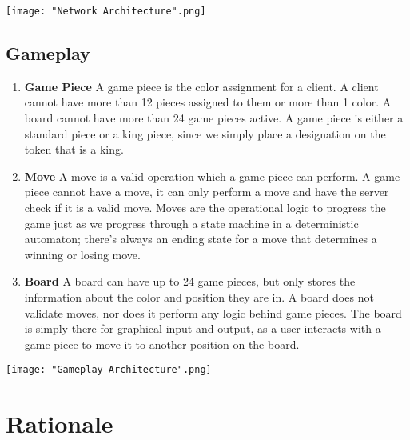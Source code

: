 \documentclass{scrreprt}
\begin{document}
			 \texttt{[image: "Network Architecture".png]}

		\subsection {Gameplay}
			\begin{enumerate} [label*=\arabic*.]
			\item \textbf{Game Piece}
				A game piece is the color assignment for a client. A client cannot have more than 12 pieces assigned to them or more than 1 color. A board cannot have more than 24 game pieces active. A game piece is either a standard piece or a king piece, since we simply place a designation on the token that is a king.
	
			\item \textbf{Move}
				A move is a valid operation which a game piece can perform. A game piece cannot have a move, it can only perform a move and have the server check if it is a valid move. Moves are the operational logic to progress the game just as we progress through a state machine in a deterministic automaton; there's always an ending state for a move that determines a winning or losing move.

			\item \textbf{Board}
				A board can have up to 24 game pieces, but only stores the information about the color and position they are in. A board does not validate moves, nor does it perform any logic behind game pieces. The board is simply there for graphical input and output, as a user interacts with a game piece to move it to another position on the board. 

			\end{enumerate}

		 \texttt{[image: "Gameplay Architecture".png]}
		

	\section{Rationale}
\end{document}
